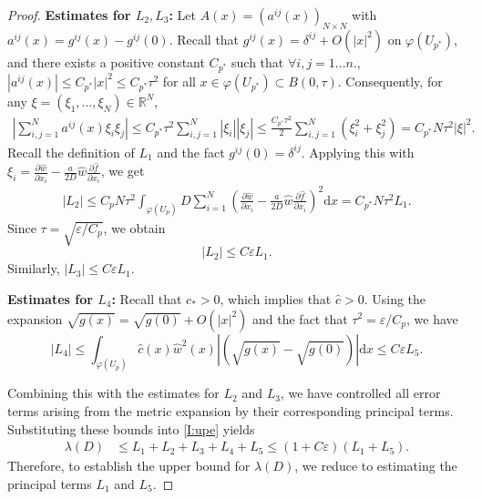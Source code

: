 \documentclass[12pt,reqno]{amsart}
\numberwithin{equation}{section}
\begin{document}
\begin{proof}
\textbf{Estimates for $L_2,L_3$:} Let $A(x) = (a^{ij}(x))_{N \times N}$ with $a^{ij}(x) = g^{ij}(x) - g^{ij}(0)$. Recall that $g^{ij}(x) = \delta^{ij} + O(|x|^2)$ on $\varphi(U_{p^*})$, and there exists a positive constant $C_{p^*}$ such that $\forall i,j=1...n.$, $
|a^{ij}(x)| \le C_{p^*}|x|^2 \le C_{p^*}\tau^2$ for all $x \in \varphi(U_{p^*}) \subset B(0, \tau)$. Consequently, for any $\xi = (\xi_1, \ldots, \xi_N) \in \mathbb{R}^N$, 
\begin{align*}
\left| \sum_{i,j=1}^N a^{ij}(x) \xi_i \xi_j \right| \le C_{p^*}\tau^2 \sum_{i,j=1}^N |\xi_i| |\xi_j| \le \frac{C_{p^*}\tau^2}{2}  \sum_{i,j=1}^N (\xi_i^2 + \xi_j^2)  = C_{p^*} N \tau^2 |\xi|^2.
\end{align*}
Recall the definition of $L_1$ and the fact $g^{ij}(0)=\delta^{ij}$. Applying this with $\xi_i = \frac{\partial \hat{w}}{\partial x_i} - \frac{a}{2D} \hat{w} \frac{\partial \hat{f}}{\partial x_i}$, we get
\begin{align*}
|L_2| 
\le C_p N \tau^2 \int_{\varphi(U_p)} D \sum_{i=1}^N \left( \frac{\partial \hat{w}}{\partial x_i} - \frac{a}{2D} \hat{w} \frac{\partial \hat{f}}{\partial x_i} \right)^2 \mathrm{d}x = C_{p^*} N \tau^2 L_1.
\end{align*}
Since $\tau=\sqrt{\varepsilon / C_p}$,  we obtain
\[
|L_2| \le C\varepsilon L_1.
\]
 Similarly, $|L_3|\leqslant
C\varepsilon L_1$. 


\textbf{Estimates for $L_4$:}  Recall that $c_*>0$, which implies that $\hat{c}>0$. Using the expansion $\sqrt{ g(x)} = \sqrt{g(0)} + O(|x|^2)$ and the fact that $\tau^2=\varepsilon/C_p$, we have 
\begin{equation*}
    |L_4|\le\int_{\varphi(U_p)} \hat{c}(x) \hat{w}^2(x)
 \left|\left(\sqrt{g(x)}-\sqrt{g(0)}\right)\right|\mathrm{d} x\le C\varepsilon L_5.
\end{equation*}

Combining this with the estimates for $L_2$ and $L_3$, we have controlled all error terms arising from the metric expansion by their corresponding principal terms. Substituting these bounds into \eqref{I:upe} yields
\begin{align}\label{UBL}
\lambda(D) &\le L_1 + L_2 + L_3 + L_4 + L_5 \le (1 + C\varepsilon) (L_1 + L_5).
\end{align}
Therefore, to establish the upper bound for $\lambda(D)$, we reduce to estimating the principal terms $L_1$ and $L_5$.


\end{proof}
\end{document}
